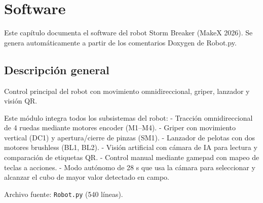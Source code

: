 \chapter{Software}
\label{chap:software}
Este capítulo documenta el software del robot Storm Breaker (MakeX 2026). Se genera automáticamente a partir de los comentarios Doxygen de Robot.py.

\section{Descripci\'on general}
Control principal del robot con movimiento omnidireccional, griper, lanzador y visión QR.

Este módulo integra todos los subsistemas del robot: - Tracción omnidireccional de 4 ruedas mediante motores encoder (M1–M4). - Griper con movimiento vertical (DC1) y apertura/cierre de pinzas (SM1). - Lanzador de pelotas con dos motores brushless (BL1, BL2). - Visión artificial con cámara de IA para lectura y comparación de etiquetas QR. - Control manual mediante gamepad con mapeo de teclas a acciones. - Modo autónomo de 28 s que usa la cámara para seleccionar y alcanzar el cubo de mayor valor detectado en campo.

Archivo fuente: \texttt{Robot.py} (540 l\'ineas).
